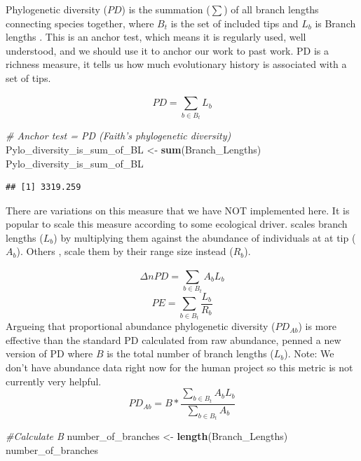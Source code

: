 \documentclass[]{book}
\newenvironment{Shaded}{\begin{snugshade}}{\end{snugshade}}
\newcommand{\KeywordTok}[1]{\textcolor[rgb]{0.13,0.29,0.53}{\textbf{{#1}}}}
\newcommand{\StringTok}[1]{\textcolor[rgb]{0.31,0.60,0.02}{{#1}}}
\newcommand{\CommentTok}[1]{\textcolor[rgb]{0.56,0.35,0.01}{\textit{{#1}}}}
\newcommand{\NormalTok}[1]{{#1}}
\theoremstyle{definition}
\theoremstyle{definition}
\theoremstyle{remark}
\begin{document}
Phylogenetic diversity (\(PD\)) is the summation (\(\sum\)) of all
branch lengths connecting species together, where \(B_{t}\) is the set
of included tips and \(L_{b}\) is Branch lengths \citep{Faith1992}. This
is an anchor test, which means it is regularly used, well understood,
and we should use it to anchor our work to past work. PD is a richness
measure, it tells us how much evolutionary history is associated with a
set of tips.

\[PD = \sum_{b \in B_{t}}^{}L_{b}\]

\begin{Shaded}
\begin{Highlighting}[]
\CommentTok{# Anchor test = PD (Faith's phylogenetic diversity)}
\NormalTok{Pylo_diversity_is_sum_of_BL <-}\StringTok{ }\KeywordTok{sum}\NormalTok{(Branch_Lengths)}
\NormalTok{Pylo_diversity_is_sum_of_BL}
\end{Highlighting}
\end{Shaded}

\begin{verbatim}
## [1] 3319.259
\end{verbatim}

There are variations on this measure that we have NOT implemented here.
It is popular to scale this measure according to some ecological driver.
\citet{Barker2002} scales branch lengths (\(L_{b}\)) by multiplying them
against the abundance of individuals at at tip (\(A_{b}\)). Others
\citep{Rosauer2009}, scale them by their range size instead (\(R_{b}\)).

\[\Delta n PD = \sum_{b \in B_{t}}^{}A_{b}L_{b}\]
\[PE = \sum_{b \in B_{t}}^{}\dfrac{L_{b}}{R_{b}}\] Argueing that
proportional abundance phylogenetic diversity (\(PD_{Ab}\)) is more
effective than the standard PD calculated from raw abundance,
\citet{Vellend2011} penned a new version of PD where \(B\) is the total
number of branch lengths (\(L_{b}\)). Note: We don't have abundance data
right now for the human project so this metric is not currently very
helpful.\\
\[PD_{Ab} = B * \dfrac{\sum_{b \in B_{t}}^{}A_{b}L_{b}}{\sum_{b \in B_{t}}^{}A_{b}}\]

\begin{Shaded}
\begin{Highlighting}[]
\CommentTok{#Calculate B}
\NormalTok{number_of_branches <-}\StringTok{ }\KeywordTok{length}\NormalTok{(Branch_Lengths)}
\NormalTok{number_of_branches}
\end{Highlighting}
\end{Shaded}
\end{document}
